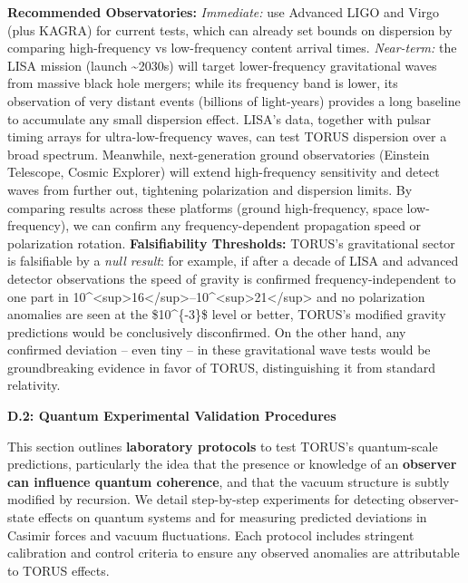 \documentclass[
]{article}
\begin{document}
\textbf{Recommended Observatories:} \emph{Immediate:} use Advanced LIGO
and Virgo (plus KAGRA) for current tests, which can already set bounds
on dispersion by comparing high-frequency vs low-frequency content
arrival times\hspace{0pt}. \emph{Near-term:} the LISA mission (launch
\textasciitilde2030s) will target lower-frequency gravitational waves
from massive black hole mergers; while its frequency band is lower, its
observation of very distant events (billions of light-years) provides a
long baseline to accumulate any small dispersion effect\hspace{0pt}.
LISA's data, together with pulsar timing arrays for ultra-low-frequency
waves, can test TORUS dispersion over a broad spectrum. Meanwhile,
next-generation ground observatories (Einstein Telescope, Cosmic
Explorer) will extend high-frequency sensitivity and detect waves from
further out, tightening polarization and dispersion limits. By comparing
results across these platforms (ground high-frequency, space
low-frequency), we can confirm any frequency-dependent propagation speed
or polarization rotation. \textbf{Falsifiability Thresholds:} TORUS's
gravitational sector is falsifiable by a \emph{null result}: for
example, if after a decade of LISA and advanced detector observations
the speed of gravity is confirmed frequency-independent to one part in
10\^{}\textless sup\textgreater16\textless/sup\textgreater--10\^{}\textless sup\textgreater21\textless/sup\textgreater{}
and no polarization anomalies are seen at the \$10\^{}\{-3\}\$ level or
better, TORUS's modified gravity predictions would be conclusively
disconfirmed\hspace{0pt}. On the other hand, any confirmed deviation --
even tiny -- in these gravitational wave tests would be groundbreaking
evidence in favor of TORUS, distinguishing it from standard relativity.

\textbf{D.2: Quantum Experimental Validation Procedures}

This section outlines \textbf{laboratory protocols} to test TORUS's
quantum-scale predictions, particularly the idea that the presence or
knowledge of an \textbf{observer can influence quantum coherence}, and
that the vacuum structure is subtly modified by recursion. We detail
step-by-step experiments for detecting observer-state effects on quantum
systems and for measuring predicted deviations in Casimir forces and
vacuum fluctuations. Each protocol includes stringent calibration and
control criteria to ensure any observed anomalies are attributable to
TORUS effects.
\end{document}
